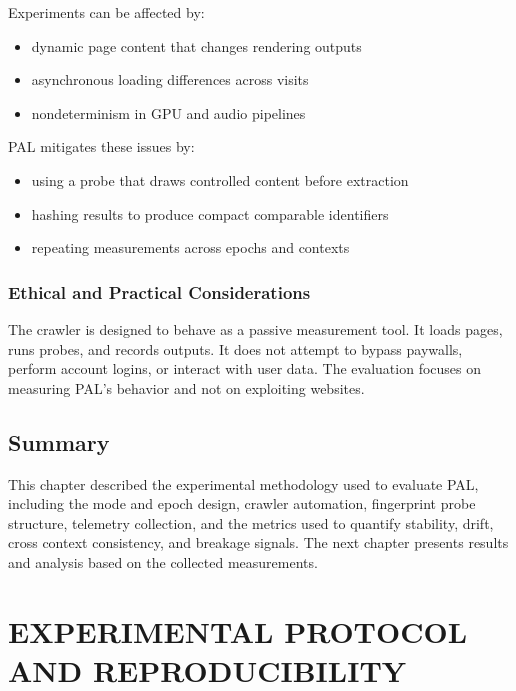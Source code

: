 \documentclass[11pt]{report}
\begin{document}
Experiments can be affected by:

\begin{itemize}
    \item dynamic page content that changes rendering outputs
    \item asynchronous loading differences across visits
    \item nondeterminism in GPU and audio pipelines
\end{itemize}

PAL mitigates these issues by:

\begin{itemize}
    \item using a probe that draws controlled content before extraction
    \item hashing results to produce compact comparable identifiers
    \item repeating measurements across epochs and contexts
\end{itemize}

\subsection{Ethical and Practical Considerations}

The crawler is designed to behave as a passive measurement tool. It loads pages, runs probes, and records outputs. It does not attempt to bypass paywalls, perform account logins, or interact with user data. The evaluation focuses on measuring PAL's behavior and not on exploiting websites.

\section{Summary}

This chapter described the experimental methodology used to evaluate PAL, including the mode and epoch design, crawler automation, fingerprint probe structure, telemetry collection, and the metrics used to quantify stability, drift, cross context consistency, and breakage signals. The next chapter presents results and analysis based on the collected measurements.






\chapter{EXPERIMENTAL PROTOCOL AND REPRODUCIBILITY}
\end{document}
